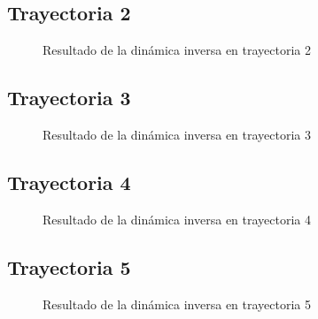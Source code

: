         \newpage

                
    \subsection{Trayectoria 2}
    
        \begin{figure}[h]
            \centering
            
            \caption{Resultado de la dinámica inversa en trayectoria 2}
            \label{f:cap7_tray2}
        \end{figure}
        

        
    \subsection{Trayectoria 3}
    
        \begin{figure}[h]
            \centering
            
            \caption{Resultado de la dinámica inversa en trayectoria 3}
            \label{f:cap7_tray3}
        \end{figure}

        \newpage

                
    \subsection{Trayectoria 4}
    
        \begin{figure}[h]
            \centering
            
            \caption{Resultado de la dinámica inversa en trayectoria 4}
            \label{f:cap7_tray4}
        \end{figure}
        

    \subsection{Trayectoria 5}
    
        \begin{figure}[h]
            \centering
            
            \caption{Resultado de la dinámica inversa en trayectoria 5}
            \label{f:cap7_tray5}
        \end{figure}

